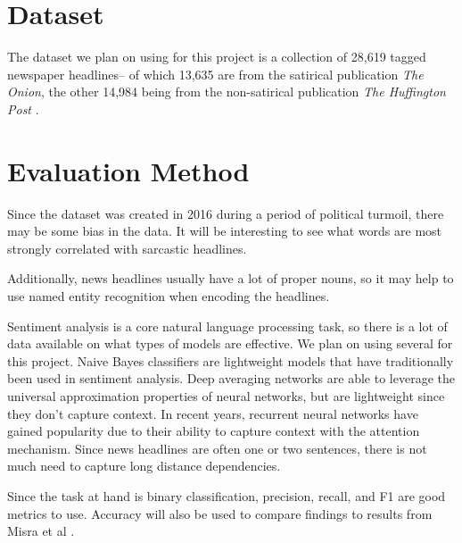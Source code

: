 \documentclass[11pt]{article}
\begin{document}


\section{Dataset}

\par{The dataset we plan on using for this project is a collection of 28,619
tagged newspaper headlines-- of which 13,635 are from the satirical publication
\textit{The Onion}, the other 14,984 being from the non-satirical publication
\textit{The Huffington Post} \cite{misra2023Sarcasm}.}



\section{Evaluation Method}

\par{Since the dataset was created in 2016 during a period of political
turmoil, there may be some bias in the data. It will be interesting to see what
words are most strongly correlated with sarcastic headlines.}

\par{Additionally, news headlines usually have a lot of proper nouns, so it may
help to use named entity recognition when encoding the headlines.}

\par{Sentiment analysis is a core natural language processing task, so there is
a lot of data available on what types of models are effective. We plan on using
several for this project. Naive Bayes classifiers are lightweight models that
have traditionally been used in sentiment analysis. Deep averaging networks are
able to leverage the universal approximation properties of neural networks, but
are lightweight since they don't capture context. In recent years, recurrent
neural networks have gained popularity due to their ability to capture context
with the attention mechanism. Since news headlines are often one or two
sentences, there is not much need to capture long distance dependencies.}

\par{Since the task at hand is binary classification, precision, recall, and F1
are good metrics to use. Accuracy will also be used to compare findings to
results from Misra et al \cite{misra2023Sarcasm}.}

\printbibliography
\end{document}
